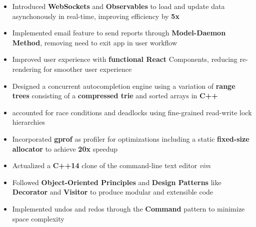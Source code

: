 \documentclass[10pt,a4paper,ragged2e]{altacv}
\begin{document}
\divider

\begin{itemize}
    \item Introduced \textbf{WebSockets} and \textbf{Observables} to load and update data asynchonously in real-time, improving efficiency by \textbf{5x}
    \item Implemented email feature to send reports through \textbf{Model-Daemon Method}, removing need to exit app in user workflow
    \item Improved user experience with \textbf{functional React} Components, reducing re-rendering for smoother user experience 
\end{itemize}


\begin{itemize}
    \item Designed a concurrent autocompletion engine using a variation of \textbf{range trees} consisting of a \textbf{compressed trie} and sorted arrays in \textbf{C++}
    \item accounted for race conditions and deadlocks using fine-grained read-write lock hierarchies
    \item Incorporated \textbf{gprof} as profiler for optimizations including a static \textbf{fixed-size allocator} to achieve \textbf{20x} speedup
\end{itemize}

\divider

\begin{itemize}
    \item Actualized a \textbf{C++14} clone of the command-line text editor \textit{vim}
    \item Followed \textbf{Object-Oriented Principles} and \textbf{Design Patterns} like \textbf{Decorator} and \textbf{Visitor} to produce modular and extensible code
    \item Implemented undos and redos through the \textbf{Command} pattern to minimize space complexity
\end{itemize}
\end{document}

